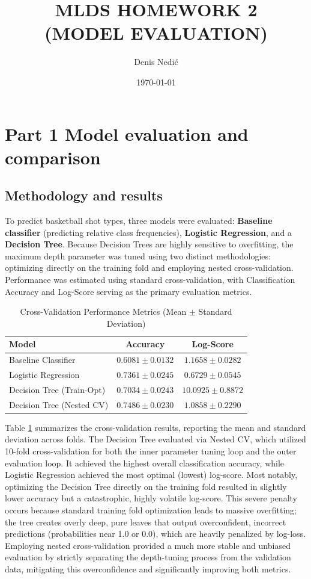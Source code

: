 \documentclass[11pt, a4paper]{article}
\title{{\bf MLDS HOMEWORK 2} \\
(MODEL EVALUATION)}
\author{Denis Nedić}
\date{\today}
\begin{document}
\maketitle
\vspace{-1cm} %

\section{\bf{Part 1} Model evaluation and comparison}
\subsection{Methodology and results}
To predict basketball shot types, three models were evaluated: \textbf{Baseline classifier} (predicting relative class frequencies), \textbf{Logistic Regression}, and a \textbf{Decision Tree}.
Because Decision Trees are highly sensitive to overfitting, the maximum depth parameter was tuned using two distinct methodologies: optimizing directly on the training fold
and employing nested cross-validation. Performance was estimated using standard cross-validation, with Classification Accuracy and Log-Score serving as the primary evaluation metrics.
\begin{table}[htpb]
    \centering
    \caption{Cross-Validation Performance Metrics (Mean $\pm$ Standard Deviation)}
    \label{tab:model_comparison}
    \begin{tabular}{lcc}
        \toprule
        \textbf{Model} & \textbf{Accuracy} & \textbf{Log-Score} \\
        \midrule
        Baseline Classifier & $0.6081 \pm 0.0132$ & $1.1658 \pm 0.0282$ \\
        Logistic Regression & $0.7361 \pm 0.0245$ & $\mathbf{0.6729 \pm 0.0545}$ \\
        Decision Tree (Train-Opt) & $0.7034 \pm 0.0243$ & $10.0925 \pm 0.8872$ \\
        Decision Tree (Nested CV) & $\mathbf{0.7486 \pm 0.0230}$ & $1.0858 \pm 0.2290$ \\
        \bottomrule
    \end{tabular}
\end{table}
Table \ref{tab:model_comparison} summarizes the cross-validation results, reporting the mean and standard deviation across folds. The Decision Tree evaluated via Nested CV, which utilized 10-fold
cross-validation for both the inner parameter tuning loop and the outer evaluation loop. It achieved the highest overall classification accuracy, while Logistic Regression achieved the most optimal 
(lowest) log-score. Most notably, optimizing the Decision Tree directly on the training fold resulted in slightly lower accuracy but a catastrophic, highly volatile log-score. This severe penalty 
occurs because standard training fold optimization leads to massive overfitting; the tree creates overly deep, pure leaves that output overconfident, incorrect predictions (probabilities near 1.0 or 0.0), 
which are heavily penalized by log-loss. Employing nested cross-validation provided a much more stable and unbiased evaluation by strictly separating the depth-tuning process from the validation data, mitigating this overconfidence and significantly improving both metrics.
\end{document}
